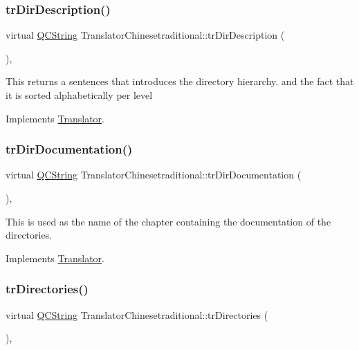 \subsubsection{\texorpdfstring{trDirDescription()}{trDirDescription()}}
{\footnotesize\ttfamily virtual \mbox{\hyperlink{class_q_c_string}{Q\+C\+String}} Translator\+Chinesetraditional\+::tr\+Dir\+Description (\begin{DoxyParamCaption}{ }\end{DoxyParamCaption})\hspace{0.3cm}{\ttfamily [inline]}, {\ttfamily [virtual]}}

This returns a sentences that introduces the directory hierarchy. and the fact that it is sorted alphabetically per level 

Implements \mbox{\hyperlink{class_translator}{Translator}}.

\mbox{\label{class_translator_chinesetraditional_a963d993d8ff90c7c31418a6619587786}} 
\subsubsection{\texorpdfstring{trDirDocumentation()}{trDirDocumentation()}}
{\footnotesize\ttfamily virtual \mbox{\hyperlink{class_q_c_string}{Q\+C\+String}} Translator\+Chinesetraditional\+::tr\+Dir\+Documentation (\begin{DoxyParamCaption}{ }\end{DoxyParamCaption})\hspace{0.3cm}{\ttfamily [inline]}, {\ttfamily [virtual]}}

This is used as the name of the chapter containing the documentation of the directories. 

Implements \mbox{\hyperlink{class_translator}{Translator}}.

\mbox{\label{class_translator_chinesetraditional_a7d0523cee408b8a61b6805765ef58965}} 
\subsubsection{\texorpdfstring{trDirectories()}{trDirectories()}}
{\footnotesize\ttfamily virtual \mbox{\hyperlink{class_q_c_string}{Q\+C\+String}} Translator\+Chinesetraditional\+::tr\+Directories (\begin{DoxyParamCaption}{ }\end{DoxyParamCaption})\hspace{0.3cm}{\ttfamily [inline]}, {\ttfamily [virtual]}}

